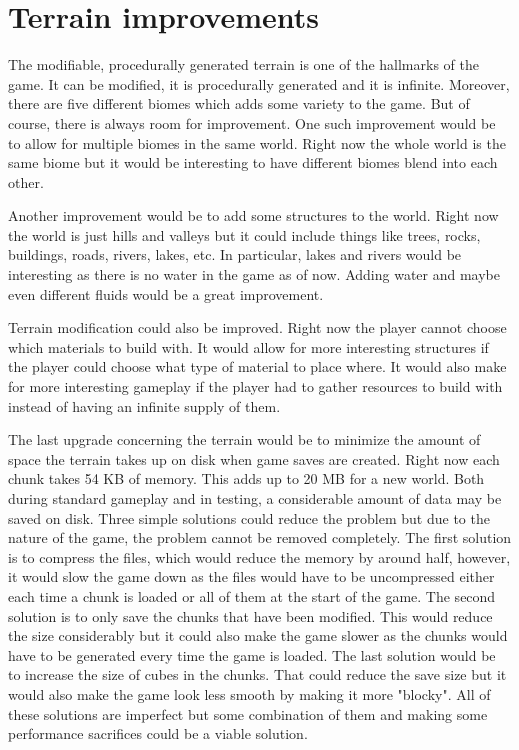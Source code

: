 \section{Terrain improvements}
The modifiable, procedurally generated terrain is one of the hallmarks of the game.
It can be modified, it is procedurally generated and it is infinite.
Moreover, there are five different biomes which adds some variety to the game.
But of course, there is always room for improvement.
One such improvement would be to allow for multiple biomes in the same world.
Right now the whole world is the same biome but it would be interesting to have different biomes blend into each other.

Another improvement would be to add some structures to the world.
Right now the world is just hills and valleys but it could include things like trees, rocks, buildings, roads, rivers, lakes, etc.
In particular, lakes and rivers would be interesting as there is no water in the game as of now.
Adding water and maybe even different fluids would be a great improvement.

Terrain modification could also be improved.
Right now the player cannot choose which materials to build with.
It would allow for more interesting structures if the player could choose what type of material to place where.
It would also make for more interesting gameplay if the player had to gather resources to build with instead of having an infinite supply of them.

The last upgrade concerning the terrain would be to minimize the amount of space the terrain takes up on disk when game saves are created.
Right now each chunk takes 54 KB of memory.
This adds up to 20 MB for a new world.
Both during standard gameplay and in testing, a considerable amount of data may be saved on disk.
Three simple solutions could reduce the problem but due to the nature of the game, the problem cannot be removed completely.
The first solution is to compress the files, which would reduce the memory by around half, however, it would slow the game down as the files would have to be uncompressed either each time a chunk is loaded or all of them at the start of the game.
The second solution is to only save the chunks that have been modified.
This would reduce the size considerably but it could also make the game slower as the chunks would have to be generated every time the game is loaded.
The last solution would be to increase the size of cubes in the chunks.
That could reduce the save size but it would also make the game look less smooth by making it more "blocky".
All of these solutions are imperfect but some combination of them and making some performance sacrifices could be a viable solution.